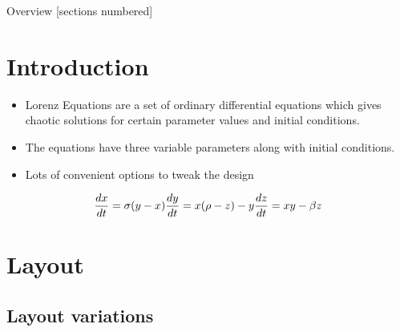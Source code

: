 \titleframe

\begin{frame}{Overview}
  [sections numbered]
  \tableofcontents[hideallsubsections]
\end{frame}


\section{Introduction}
\begin{frame}{\insertsectionhead}
  \begin{itemize}
    \item Lorenz Equations are a set of ordinary differential equations which gives chaotic solutions for certain parameter values and initial conditions.
    \item The equations have three variable parameters along with initial conditions.
    \item Lots of convenient options to tweak the design
  \end{itemize}
	\[
	\frac{dx}{dt} = \sigma(y-x)\\
	\frac{dy}{dt} = x(\rho - z) - y\\
	\frac{dz}{dt} = xy - \beta z\\
	\]
\end{frame}


\section{Layout}

\subsection{Layout variations}

